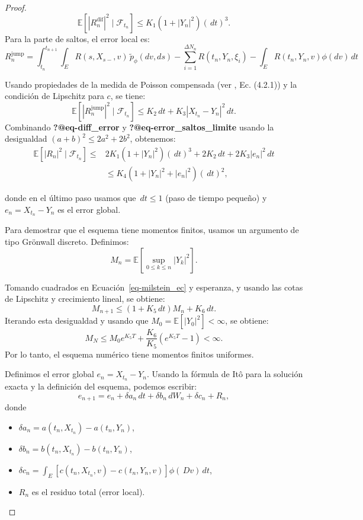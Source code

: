 \documentclass[
  spanish,
  us-letterpaper,
]{scrreprt}
\theoremstyle{plain}
\theoremstyle{plain}
\theoremstyle{definition}
\theoremstyle{remark}
\begin{document}
\begin{proof}
\[\mathbb{E}\left[ |R_n^{\text{dif}}|^2 \mid \mathcal{F}_{t_n} \right] \leq K_1 (1 + |Y_n|^2) (\,dt)^3.\]
Para la parte de saltos, el error local es:
\[R_n^{\text{jump}} = \int_{t_n}^{t_{n+1}} \int_E R(s, X_{s-}, v)\,\tilde{p}_\phi(dv, ds) - \sum_{i=1}^{\Delta N_n} R(t_n, Y_n, \xi_i) - \int_E R(t_n, Y_n, v)\phi(dv)\,dt\]

Usando propiedades de la medida de Poisson compensada (ver
\textcite{platen2010numerical}, Ec. (4.2.1)) y la condición de Lipschitz
para \(c\), se tiene:
\[\mathbb{E}\left[ |R_n^{\text{jump}}|^2 \mid \mathcal{F}_{t_n} \right] \leq K_2 \,dt + K_3 |X_{t_n} - Y_n|^2 \,dt.\]
Combinando \textbf{?@eq-diff\_error} y
\textbf{?@eq-error\_saltos\_limite} usando la desigualdad
\((a+b)^2 \leq 2a^2 + 2b^2\), obtenemos: \[\begin{aligned}
\mathbb{E}\left[ |R_n|^2 \mid \mathcal{F}_{t_n} \right] \leq {}& 2K_1 (1 + |Y_n|^2) (\,dt)^3 + 2K_2 \,dt + 2K_3 |e_n|^2 \,dt \\
& \leq K_4 (1 + |Y_n|^2 + |e_n|^2) (\,dt)^2,
\end{aligned}\]

donde en el último paso usamos que \(\, dt \leq 1\) (paso de tiempo
pequeño) y \(e_n = X_{t_n} - Y_n\) es el error global.

Para demostrar que el esquema tiene momentos finitos, usamos un
argumento de tipo Grönwall discreto. Definimos:
\[M_n = \mathbb{E}\left[ \sup_{0 \leq k \leq n} |Y_k|^2 \right].\]

Tomando cuadrados en Ecuación~\ref{eq-milstein_ec} y esperanza, y usando
las cotas de Lipschitz y crecimiento lineal, se obtiene:
\[M_{n+1} \leq (1 + K_5 \, dt) M_n + K_6 \, dt.\] Iterando esta
desigualdad y usando que \(M_0 = \mathbb{E}[|Y_0|^2] < \infty\), se
obtiene:
\[M_N \leq M_0 e^{K_5 T} + \frac{K_6}{K_5} (e^{K_5 T} - 1) < \infty.\]
Por lo tanto, el esquema numérico tiene momentos finitos uniformes.

Definimos el error global \(e_n = X_{t_n} - Y_n\). Usando la fórmula de
Itô para la solución exacta y la definición del esquema, podemos
escribir:
\[e_{n+1} = e_n + \delta a_n \,dt + \delta b_n \,dW_n + \delta c_n + R_n,\]
donde

\begin{itemize}
\item
  \(\delta a_n = a(t_n, X_{t_n}) - a(t_n, Y_n)\),
\item
  \(\delta b_n = b(t_n, X_{t_n}) - b(t_n, Y_n)\),
\item
  \(\delta c_n = \int_E [c(t_n, X_{t_n}, v) - c(t_n, Y_n, v)] \phi(\,D v) \, dt\),
\item
  \(R_n\) es el residuo total (error local).
\end{itemize}


\end{proof}
\end{document}
